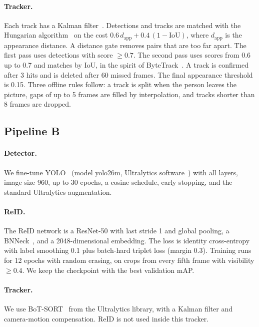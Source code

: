 \documentclass[11pt,letterpaper]{article}
\begin{document}
\paragraph{Tracker.}
Each track has a Kalman filter~\cite{kalman1960}.
Detections and tracks are matched with the Hungarian algorithm~\cite{kuhn1955hungarian} on the cost $0.6\,d_{\mathrm{app}} + 0.4\,(1-\mathrm{IoU})$, where $d_{\mathrm{app}}$ is the appearance distance.
A distance gate removes pairs that are too far apart.
The first pass uses detections with score $\geq 0.7$.
The second pass uses scores from 0.6 up to 0.7 and matches by IoU, in the spirit of ByteTrack~\cite{zhang2022bytetrack}.
A track is confirmed after 3 hits and is deleted after 60 missed frames.
The final appearance threshold is 0.15.
Three offline rules follow: a track is split when the person leaves the picture, gaps of up to 5 frames are filled by interpolation, and tracks shorter than 8 frames are dropped.

\subsection{Pipeline B}\label{sec:pipeB}
\paragraph{Detector.}
We fine-tune YOLO~\cite{redmon2016yolo} (model yolo26m, Ultralytics software~\cite{ultralytics}) with all layers, image size 960, up to 30 epochs, a cosine schedule, early stopping, and the standard Ultralytics augmentation.

\paragraph{ReID.}
The ReID network is a ResNet-50 with last stride 1 and global pooling, a BNNeck~\cite{luo2019bagoftricks}, and a 2048-dimensional embedding.
The loss is identity cross-entropy with label smoothing 0.1 plus batch-hard triplet loss (margin 0.3).
Training runs for 12 epochs with random erasing, on crops from every fifth frame with visibility $\geq 0.4$.
We keep the checkpoint with the best validation mAP.

\paragraph{Tracker.}
We use BoT-SORT~\cite{aharon2022botsort} from the Ultralytics library, with a Kalman filter and camera-motion compensation.
ReID is not used inside this tracker.
\end{document}

